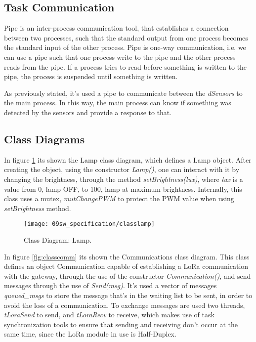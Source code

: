 \subsection{Task Communication}

Pipe is an inter-process communication tool, that establishes a connection between two processes, such that the standard output from one process becomes the standard input of the other process. Pipe is one-way communication, i.e, we can use a pipe such that one process write to the pipe and the other process reads from the pipe. If a process tries to read before something is written to the pipe, the process is suspended until something is written.

As previously stated, it's used a pipe to communicate between the \textit{dSensors} to the main process. In this way, the main process can know if something was detected by the sensors and provide a response to that.


\subsection{Class Diagrams}


In figure \ref{fig:classlamp} its shown the Lamp class diagram, which defines a Lamp object. After creating the object, using the constructor \textit{Lamp()}, one can interact with it by changing the brightness, through the method \textit{setBrightness(lux)}, where \textit{lux} is a value from 0, lamp OFF, to 100, lamp at maximum brightness. Internally, this class uses a mutex, \textit{mutChangePWM} to protect the PWM value when using \textit{setBrightness} method. 

\begin{figure}[H]
	\centering
	\texttt{[image: 09sw\_specification/classlamp]}
	\caption{Class Diagram: Lamp.}
	\label{fig:classlamp}
\end{figure}


In figure \ref{fig:classcomm} its shown the Communications class diagram. This class defines an object Communication capable of establishing a LoRa communication with the gateway, through the use of the constructor \textit{Communication()}, and send messages through the use of \textit{Send(msg)}. It's used a vector of messages \textit{queued\_msgs} to store the message that's in the waiting list to be sent, in order to avoid the loss of a communication. To exchange messages are used two threads, \textit{tLoraSend} to send, and \textit{tLoraRecv} to receive, which makes use of task synchronization tools to ensure that sending and receiving don't occur at the same time, since the LoRa module in use is Half-Duplex.

